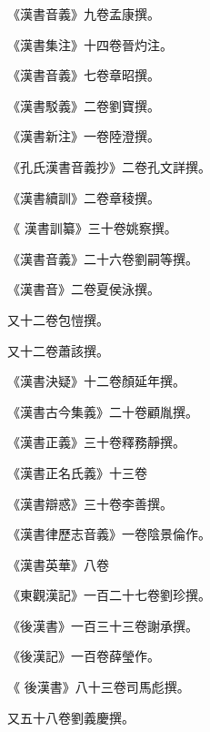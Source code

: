\begin{pinyinscope}
 《漢書音義》九卷孟康撰。



 《漢書集注》十四卷晉灼注。



 《漢書音義》七卷章昭撰。



 《漢書駁義》二卷劉寶撰。



 《漢書新注》一卷陸澄撰。



 《孔氏漢書音義抄》二卷孔文詳撰。



 《漢書續訓》二卷章稜撰。



 《
 漢書訓纂》三十卷姚察撰。



 《漢書音義》二十六卷劉嗣等撰。



 《漢書音》二卷夏侯泳撰。



 又十二卷包愷撰。



 又十二卷蕭該撰。



 《漢書決疑》十二卷顏延年撰。



 《漢書古今集義》二十卷顧胤撰。



 《漢書正義》三十卷釋務靜撰。



 《漢書正名氏義》十三卷



 《漢書辯惑》三十卷李善撰。



 《漢書律歷志音義》一卷陰景倫作。



 《漢書英華》八卷



 《東觀漢記》一百二十七卷劉珍撰。



 《後漢書》一百三十三卷謝承撰。



 《後漢記》一百卷薛瑩作。



 《
 後漢書》八十三卷司馬彪撰。



 又五十八卷劉義慶撰。




\end{pinyinscope}
